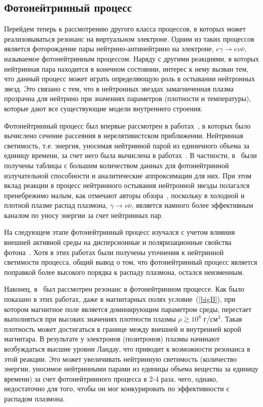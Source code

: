 \subsection{Фотонейтринный процесс}
Перейдем теперь к рассмотрению другого класса процессов, в которых может реализовываться резонанс на виртуальном электроне. Одним из таких процессов является фоторождение пары нейтрино-антинейтрино на электроне, $e\gamma\to e\nu\bar\nu$, называемое фотонейтринным процессом. Наряду с другими реакциями, в которых нейтринная пара находится в конечном состоянии, интерес к нему вызван тем, что данный процесс может играть определяющую роль в остывании нейтронных звезд. Это связано с тем, что в нейтронных звездах замагниченная плазма прозрачна для нейтрино при значениях параметров (плотности и температуры), которые дают все существующие модели внутреннего строения.

Фотонейтринный процесс был 
впервые рассмотрен в работах~\cite{Ritus:1961,Chiu:1961}, в которых было 
вычислено сечение рассеяния  в 
нерелятивистском 
приближении. Нейтринная светимость, т.е. энергия, уносимая нейтринной парой из 
единичного объема за единицу времени, за счет него была вычислена в 
работах~\cite{Beaudet:1967,Dicus:1972,Munakata:1985,Shindler:1987,Itoh:1989,Itoh:1996,Skobelev:2000}.
 В частности, в~\cite{Itoh:1989,Itoh:1996} были получены таблицы с большим 
количеством данных для фотонейтринной излучательной способности и аналитические 
аппроксимации для них. При этом вклад реакции в процесс нейтринного остывания 
нейтронной звезды полагался пренебрежимо малым, как отмечают авторы 
обзора~\cite{Yakovlev2001}, поскольку в холодной и плотной плазме распад 
плазмона, $\gamma\to\nu\bar\nu$, является намного более эффективным каналом по 
уносу энергии за счет нейтринных пар.

На следующем этапе фотонейтринный процесс изучался с учетом влияния внешней активной среды на дисперсионные и поляризационные свойства фотона~\cite{RCh:2008,Borisov:2012,RumChMik}. Хотя в этих работах были получены уточнения к нейтринной светимости процесса, общий вывод о том, что фотонейтринный процесс является поправкой более высокого порядка к распаду плазмона, остался неизменным.

Наконец, в~\cite{Chistyakov:2014cga,qfthep2017} был рассмотрен резонанс в фотонейтринном процессе. Как было показано в этих работах, даже в магнитарных полях условие~(\ref{bigB}), при котором магнитное поле является доминирующим параметром среды, перестает выполняться при высоких значениях плотности плазмы $\rho \gtrsim 10^8$ г/см$^3$. Такая плотность может достигаться в границе между внешней и внутренней корой магнитара. В результате у электронов (позитронов) плазмы начинают возбуждаться высшие уровни Ландау, что приводит к возможности резонанса в этой реакции. 
Это может увеличивать нейтринную светимость (количество энергии, уносимое нейтринными парами из единицы объема вещества за единицу времени) за счет фотонейтринного процесса в 2-4 раза, чего, однако, недостаточно для того, чтобы он мог конкурировать по эффективности с распадом плазмона.